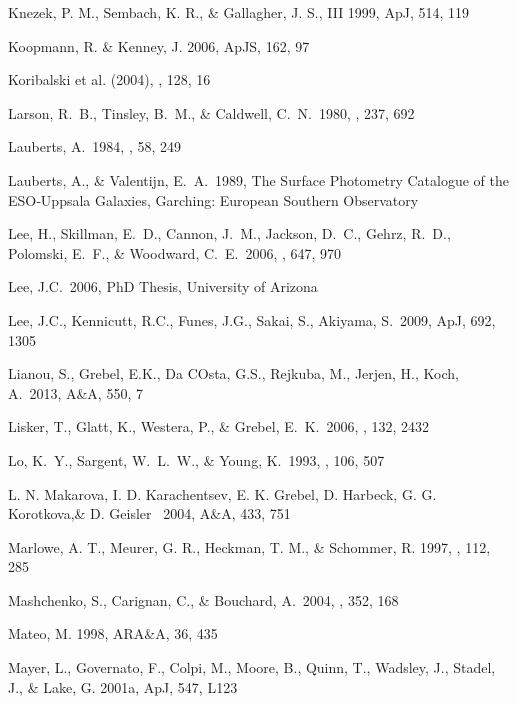 \documentclass[12pt,preprint]{emulateapj}
\begin{document}
\begin{thebibliography}{}
Knezek, P. M., Sembach, K. R., \& Gallagher, J. S., III 1999, ApJ, 514, 119

Koopmann, R. \& Kenney, J. 2006, ApJS, 162, 97

Koribalski et al. (2004),  \aj, 128, 16

Larson, R.~B., Tinsley, B.~M., \& Caldwell, C.~N.\ 1980, \apj, 237, 692 

Lauberts, A.\ 1984, \aaps, 58, 249 

Lauberts, A., \& Valentijn, E.~A.\ 1989,
The Surface Photometry Catalogue of the ESO‐Uppsala Galaxies,
Garching: European Southern Observatory  

Lee, H., Skillman, E.~D., Cannon, J.~M., Jackson, D.~C., Gehrz, R.~D., 
Polomski, E.~F., \& Woodward, C.~E.\ 2006, \apj, 647, 970 

Lee, J.C.\ 2006, PhD Thesis, University of Arizona

Lee, J.C., Kennicutt, R.C., Funes, J.G., Sakai, S., Akiyama, S.\ 2009, ApJ, 692, 1305

Lianou, S., Grebel, E.K., Da COsta, G.S., Rejkuba, M., Jerjen, H., Koch, A.\ 2013, A\&A, 550, 7

Lisker, T., Glatt, K., Westera, P., \& Grebel, E.~K.\ 2006, \aj, 132, 2432

Lo, K.~Y., Sargent, W.~L.~W., \& Young, K.\ 1993, \aj, 106, 507 

L. N. Makarova, I. D. Karachentsev, E. K. Grebel, D. Harbeck, G. G. Korotkova,\&
D. Geisler \ 2004, A\&A, 433, 751

Marlowe, A. T., Meurer, G. R., Heckman, T. M., \& Schommer, R. 1997, 
\apjs , 112, 285

Mashchenko, S., Carignan, C., \& Bouchard, A.\ 2004, \mnras, 352, 168 

Mateo, M. 1998, ARA\&A, 36, 435

Mayer, L., Governato, F., Colpi, M., Moore, B., Quinn, T., Wadsley, J., 
Stadel, J., \& Lake, G. 2001a, ApJ, 547, L123


\end{thebibliography}
\end{document}
